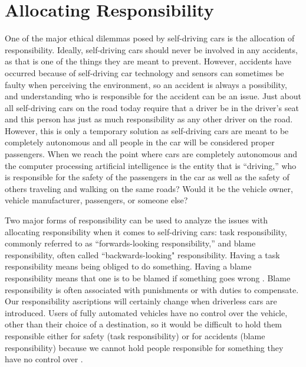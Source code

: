 \documentclass[10pt,twocolumn]{article}
\begin{document}
\section{Allocating Responsibility}
One of the major ethical dilemmas posed by self-driving cars is the allocation of responsibility. Ideally, self-driving cars should never be involved in any accidents, as that is one of the things they are meant to prevent. However, accidents have occurred because of self-driving car technology and sensors can sometimes be faulty when perceiving the environment, so an accident is always a possibility, and understanding who is responsible for the accident can be an issue. Just about all self-driving cars on the road today require that a driver be in the driver’s seat and this person has just as much responsibility as any other driver on the road. However, this is only a temporary solution as self-driving cars are meant to be completely autonomous and all people in the car will be considered proper passengers. When we reach the point where cars are completely autonomous and the computer processing artificial intelligence is the entity that is “driving,” who is responsible for the safety of the passengers in the car as well as the safety of others traveling and walking on the same roads? Would it be the vehicle owner, vehicle manufacturer, passengers, or someone else?

Two major forms of responsibility can be used to analyze the issues with allocating responsibility when it comes to self-driving cars: task responsibility, commonly referred to as “forwards-looking responsibility,” and blame responsibility, often called “backwards-looking" responsibility. Having a task responsibility means being obliged to do something. Having a blame responsibility means that one is to be blamed if something goes wrong \cite{EthicalOverview}. Blame responsibility is often associated with punishments or with duties to compensate. Our responsibility ascriptions will certainly change when driverless cars are introduced. Users of fully automated vehicles have no control over the vehicle, other than their choice of a destination, so it would be difficult to hold them responsible either for safety (task responsibility) or for accidents (blame responsibility) because we cannot hold people responsible for something they have no control over \cite{EthicalOverview}.
\end{document}
